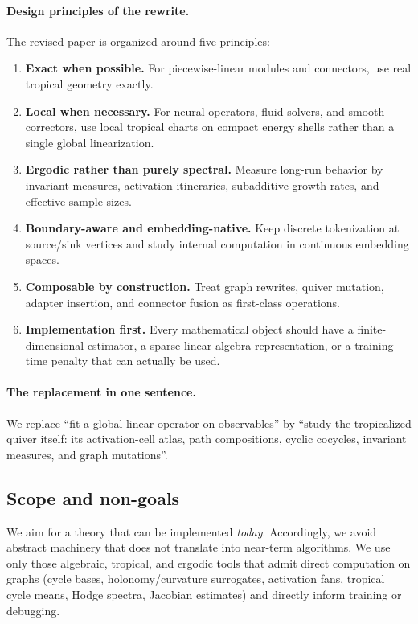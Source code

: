 \documentclass[11pt]{article}
\theoremstyle{definition}
\theoremstyle{plain}
\theoremstyle{remark}
\begin{document}
\paragraph{Design principles of the rewrite.}
The revised paper is organized around five principles:
\begin{enumerate}[leftmargin=2em]
\item \textbf{Exact when possible.} For piecewise-linear modules and connectors, use real tropical geometry exactly.
\item \textbf{Local when necessary.} For neural operators, fluid solvers, and smooth correctors, use local tropical charts on compact energy shells rather than a single global linearization.
\item \textbf{Ergodic rather than purely spectral.} Measure long-run behavior by invariant measures, activation itineraries, subadditive growth rates, and effective sample sizes.
\item \textbf{Boundary-aware and embedding-native.} Keep discrete tokenization at source/sink vertices and study internal computation in continuous embedding spaces.
\item \textbf{Composable by construction.} Treat graph rewrites, quiver mutation, adapter insertion, and connector fusion as first-class operations.
\item \textbf{Implementation first.} Every mathematical object should have a finite-dimensional estimator, a sparse linear-algebra representation, or a training-time penalty that can actually be used.
\end{enumerate}

\paragraph{The replacement in one sentence.}
We replace ``fit a global linear operator on observables'' by ``study the tropicalized quiver itself: its activation-cell atlas, path compositions, cyclic cocycles, invariant measures, and graph mutations''.

\subsection{Scope and non-goals}
We aim for a theory that can be implemented \emph{today}.
Accordingly, we avoid abstract machinery that does not translate into near-term algorithms.
We use only those algebraic, tropical, and ergodic tools that admit direct computation on graphs (cycle bases, holonomy/curvature surrogates, activation fans, tropical cycle means, Hodge spectra, Jacobian estimates) and directly inform training or debugging.
\end{document}
